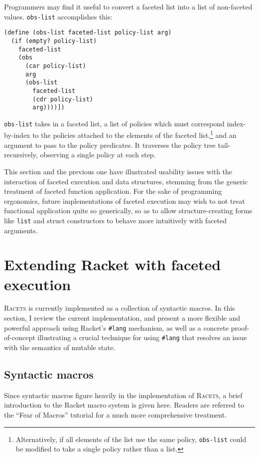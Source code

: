 \documentclass{article}
\begin{document}
Programmers may find it useful to convert a faceted list into a list of non-faceted values. \texttt{obs-list} accomplishes this:

\begin{lstlisting}
(define (obs-list faceted-list policy-list arg)
  (if (empty? policy-list)
    faceted-list
    (obs
      (car policy-list)
      arg
      (obs-list
        faceted-list
        (cdr policy-list)
        arg))))])
\end{lstlisting}

\texttt{obs-list} takes in a faceted list, a list of policies which must correspond index-by-index to the policies attached to the elements of the faceted list,\footnote{Alternatively, if all elements of the list use the same policy, \texttt{obs-list} could be modified to take a single policy rather than a list.} and an argument to pass to the policy predicates. It traverses the policy tree tail-recursively, observing a single policy at each step.

This section and the previous one have illustrated usability issues with the interaction of faceted execution and data structures, stemming from the generic treatment of faceted function application. For the sake of programming ergonomics, future implementations of faceted execution may wish to not treat functional application quite so generically, so as to allow structure-creating forms like \texttt{list} and struct constructors to behave more intuitively with faceted arguments.



\section{Extending Racket with faceted execution\label{sec:lang}}
\textsc{Racets} is currently implemented as a collection of syntactic macros. In this section, I review the current implementation, and present a more flexible and powerful approach using Racket's \texttt{\#lang} mechanism, as well as a concrete proof-of-concept illustrating a crucial technique for using \texttt{\#lang} that resolves an issue with the semantics of mutable state.


\subsection{Syntactic macros}
Since syntactic macros figure heavily in the implementation of \textsc{Racets}, a brief introduction to the Racket macro system is given here. Readers are referred to the ``Fear of Macros'' tutorial \cite{fear-of-macros} for a much more comprehensive treatment.
\end{document}
